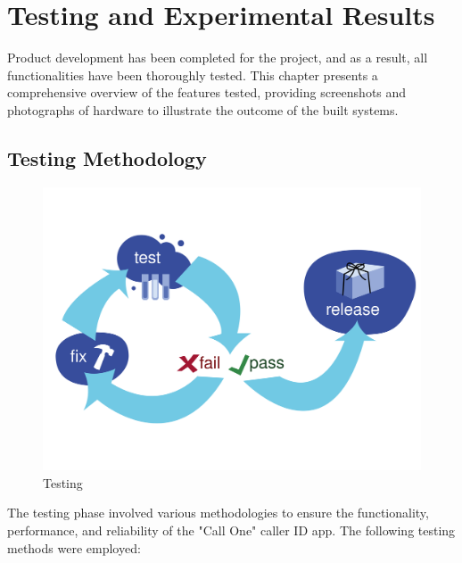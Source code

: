 \chapter{Testing and Experimental Results}
\justify

Product development has been completed for the project, and as a result, all functionalities have been thoroughly tested. This chapter presents a comprehensive overview of the features tested, providing screenshots and photographs of hardware to illustrate the outcome of the built systems.

\section{Testing Methodology}
\begin{figure}
    \centering
    \includegraphics[width=0.80\linewidth]{Media/Chapter 6/diagram_testing.png}
    \caption{Testing}
    \label{fig:Testing}
\end{figure}

The testing phase involved various methodologies to ensure the functionality, performance, and reliability of the "Call One" caller ID app. The following testing methods were employed:

